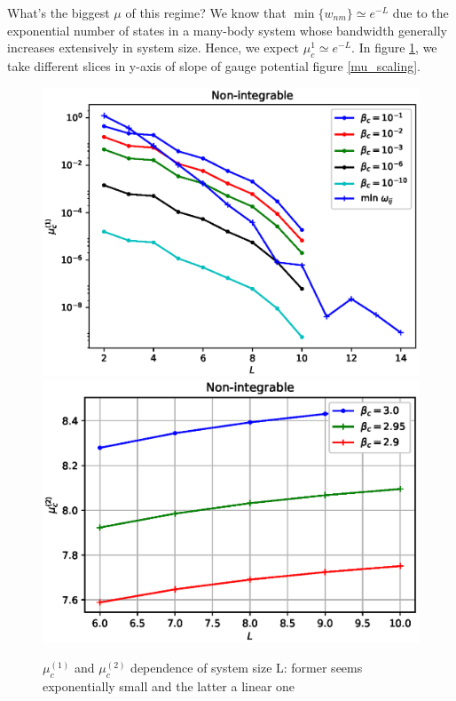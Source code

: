 \documentclass[11pt,a4paper]{article}
\begin{document}
\begin{itemize}
What's the biggest $\mu$ of this regime? We know that $\min\{w_{nm}\} \simeq e^{-L}$  due to the exponential number of states in a many-body system whose bandwidth generally increases extensively in system size. Hence, we expect $\mu_c^{1} \simeq e^{-L}$. In figure \ref{mu_c_1_nonintegrable}, we take different slices in y-axis of slope of gauge potential figure \ref{mu_scaling}.
\begin{figure}[!ht]
\begin{center}
\includegraphics[scale=0.45]{new_pics/mu_c_1_nonint.eps}
\includegraphics[scale=0.52]{new_pics/mu_c_2_nonint.eps}
\caption{$\mu_c^{(1)}$ and $\mu_c^{(2)}$ dependence of system size L: former seems exponentially small and the latter a linear one }
\label{mu_c_1_nonintegrable}
\end{center}
\end{figure}




\end{itemize}
\end{document}
